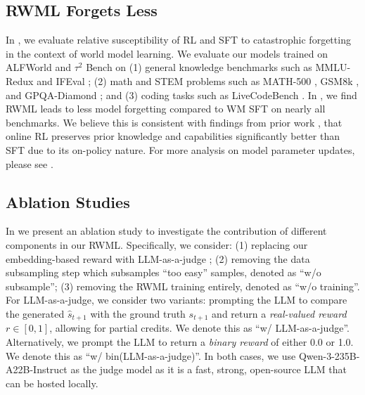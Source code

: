 \documentclass{article}
\theoremstyle{plain}
\theoremstyle{definition}
\theoremstyle{remark}
\newcommand{\shortmethod}[0]{RWML}
\newcommand{\wmrlshort}[0]{\shortmethod}
\newcommand{\wmsftshort}[0]{WM SFT}
\begin{document}
\subsection{\wmrlshort{} Forgets Less}
\label{subsec:Forgetting}

In , we evaluate relative susceptibility of RL and SFT to catastrophic
forgetting \citep{Kirkpatrick_2017,luo2025empiricalstudycatastrophicforgetting} in the context of world model learning.
We evaluate our models trained on ALFWorld and $\tau^2$ Bench on (1) general knowledge benchmarks such as MMLU-Redux \citep{gema2025mmluredux} and IFEval \citep{zhou2023instructionfollowingevaluationlargelanguage}; (2) math and STEM problems such as MATH-500 \citep{lightman2023letsmath500}, GSM8k \citep{cobbe2021trainingverifierssolvemath}, and GPQA-Diamond \citep{rein2023gpqagraduatelevelgoogleproofqa}; and (3) coding tasks such as LiveCodeBench \citep{jain2024livecodebenchholisticcontaminationfree}.
In , we find \wmrlshort{} leads to less model forgetting compared to \wmsftshort{} on nearly all benchmarks.
We believe this is consistent with findings from prior work \citep{shenfeld2025rlsrazoronlinereinforcement,chen2025retainingdoingroleonpolicy}, that online RL preserves prior knowledge and capabilities significantly better than SFT due to its on-policy nature.
For more analysis on model parameter updates, please see .


\subsection{Ablation Studies}
\label{subsec:ablation}

In  we present an ablation study to investigate the contribution of different components in our \wmrlshort{}.
Specifically, we consider: (1) replacing our embedding-based reward with LLM-as-a-judge \citep{zheng2023judgingllmasajudgemtbenchchatbot}; (2) removing the data subsampling step which subsamples ``too easy'' samples, denoted as ``w/o subsample''; (3) removing the \wmrlshort{} training entirely, denoted as ``w/o training''.
For LLM-as-a-judge, we consider two variants: prompting the LLM to compare the generated $\hat{s}_{t+1}$ with the ground truth $s_{t+1}$ and return a \emph{real-valued reward} $r\in[0,1]$, allowing for partial credits. We denote this as ``w/ LLM-as-a-judge''. Alternatively, we prompt the LLM to return a \emph{binary reward} of either 0.0 or 1.0. We denote this as ``w/ bin(LLM-as-a-judge)''.
In both cases, we use Qwen-3-235B-A22B-Instruct \citep{yang2025qwen3technicalreport} as the judge model as it is a fast, strong, open-source LLM that can be hosted locally.
\end{document}

